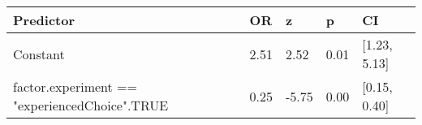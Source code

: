 \begin{tabular}{lllll}
  \toprule
Predictor & OR & z & p & CI \\ 
  \midrule
Constant & 2.51 & 2.52 & 0.01 & [1.23, 5.13] \\ 
  factor.experiment == "experiencedChoice".TRUE & 0.25 & -5.75 & 0.00 & [0.15, 0.40] \\ 
   \bottomrule
\end{tabular}
